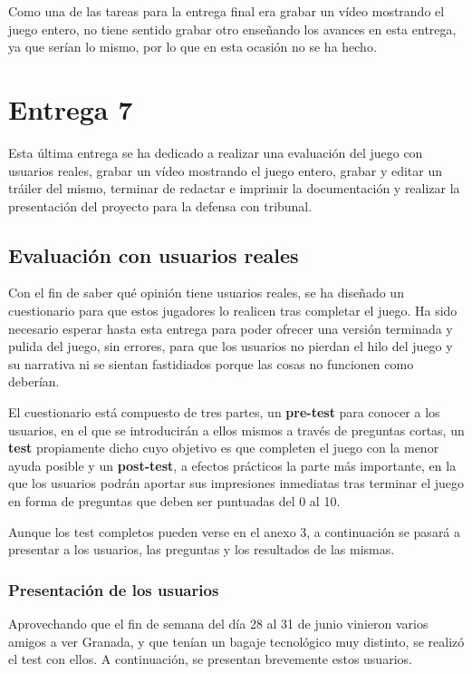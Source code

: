 Como una de las tareas para la entrega final era grabar un vídeo mostrando el juego entero, no tiene sentido grabar otro enseñando los avances en esta entrega, ya que serían lo mismo, por lo que en esta ocasión no se ha hecho.

\section{Entrega 7}

Esta última entrega se ha dedicado a realizar una evaluación del juego con usuarios reales, grabar un vídeo mostrando el juego entero, grabar y editar un tráiler del mismo, terminar de redactar e imprimir la documentación y realizar la presentación del proyecto para la defensa con tribunal.

\subsection{Evaluación con usuarios reales}

Con el fin de saber qué opinión tiene usuarios reales, se ha diseñado un cuestionario para que estos jugadores lo realicen tras completar el juego. Ha sido necesario esperar hasta esta entrega para poder ofrecer una versión terminada y pulida del juego, sin errores, para que los usuarios no pierdan el hilo del juego y su narrativa ni se sientan fastidiados porque las cosas no funcionen como deberían.

El cuestionario está compuesto de tres partes, un \textbf{pre-test} para conocer a los usuarios, en el que se introducirán a ellos mismos a través de preguntas cortas, un \textbf{test} propiamente dicho cuyo objetivo es que completen el juego con la menor ayuda posible y un \textbf{post-test}, a efectos prácticos la parte más importante, en la que los usuarios podrán aportar sus impresiones inmediatas tras terminar el juego en forma de preguntas que deben ser puntuadas del 0 al 10. 

Aunque los test completos pueden verse en el anexo 3, a continuación se pasará a presentar a los usuarios, las preguntas y los resultados de las mismas.

\subsubsection{Presentación de los usuarios}

Aprovechando que el fin de semana del día 28 al 31 de junio vinieron varios amigos a ver Granada, y que tenían un bagaje tecnológico muy distinto, se realizó el test con ellos. A continuación, se presentan brevemente estos usuarios.

